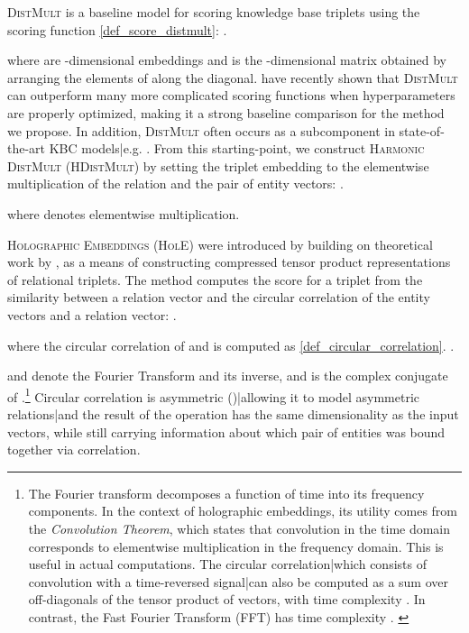 \documentclass[a4paper,10pt]{article}
\begin{document}
\textsc{DistMult} \cite{yang2015distmult} is a baseline model for scoring knowledge base triplets using the scoring function \ref{def_score_distmult}:
\ex.  \label{def_score_distmult}

where  are -dimensional embeddings and  is the -dimensional matrix obtained by arranging the elements of  along the diagonal. \citet{kaldec2017baselines} have recently shown that \textsc{DistMult} can outperform many more complicated scoring functions when hyperparameters are properly optimized, making it a strong baseline comparison for the method we propose. In addition, \textsc{DistMult} often occurs as a subcomponent in state-of-the-art KBC models|e.g. \citep{schlichtkrull2017graphconv,toutanova2015jointembedding}. From this starting-point, we construct \textsc{Harmonic DistMult} (\textsc{HDistMult}) by setting the triplet embedding  to the elementwise multiplication of the relation and the pair of entity vectors:
\ex.  \label{def_x_hdistmult}

where  denotes elementwise multiplication. 

\textsc{Holographic Embeddings} (\textsc{HolE}) were introduced by \citet{nickel2016hole} building on theoretical work by \cite{plate1995holographic}, as a means of constructing compressed tensor product representations of relational triplets. The method computes the score for a triplet  from the similarity between a relation vector and the circular correlation  of the entity vectors and a relation vector: 
\ex.  \label{def_score_HolE}

where the circular correlation of  and  is computed as \ref{def_circular_correlation}. 
\ex.  \label{def_circular_correlation}

 and  denote the Fourier Transform and its inverse, and  is the complex conjugate of .\footnote{The Fourier transform decomposes a function of time into its frequency components. In the context of holographic embeddings, its utility comes from the \emph{Convolution Theorem}, which states that convolution in the time domain corresponds to elementwise multiplication in the frequency domain. This is useful in actual computations. The circular correlation|which consists of convolution with a time-reversed signal|can also be computed as a sum over off-diagonals of the tensor product of vectors, with time complexity . In contrast, the Fast Fourier Transform (FFT) has time complexity  \citep{nickel2016hole}.  \label{note_fourier}
}
 Circular correlation is asymmetric ()|allowing it to model asymmetric relations|and the result of the operation has the same dimensionality as the input vectors, while still carrying information about which pair of entities was bound together via correlation. 
\end{document}

